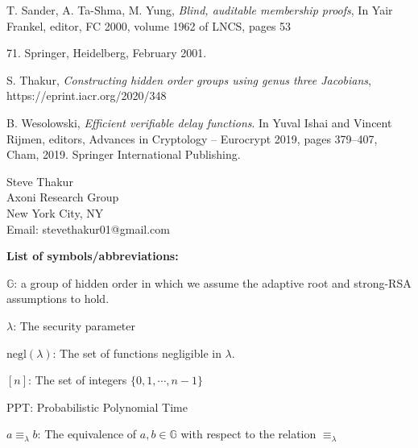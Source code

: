 \documentclass[11pt, lettersize, notitlepage, leqno, footskip=0.6cm]{article}
\newcommand{\negl}{\mr{negl}}
\newcommand{\eqlam}{\equiv_{\lam}}
\newcommand{\mb}{\mathbb}
\newcommand{\mr}{\mathrm}
\newcommand{\lam}{\lambda}
\newcommand{\noin}{\noindent}
\numberwithin{equation}{section}
\begin{document}
\noindent [STY01] T. Sander, A. Ta-Shma, M. Yung, \textit{Blind, auditable membership proofs}, In Yair Frankel, editor, FC 2000, volume 1962 of LNCS, pages 53{71. Springer, Heidelberg, February 2001.\vspace{0.1cm}


\noindent [Th20] S. Thakur, \textit{Constructing hidden order groups using genus three Jacobians}, https://eprint.iacr.org/2020/348\vspace{0.1cm} 

\noindent [Wes19] B. Wesolowski, \textit{Efficient verifiable delay functions}. In Yuval Ishai and Vincent Rijmen, editors, Advances in Cryptology – Eurocrypt 2019, pages 379–407, Cham, 2019. Springer International Publishing.\vspace{0.1cm}




\bigskip

\normalsize
\noindent Steve Thakur\\
Axoni Research Group\\
New York City, NY\\
Email: stevethakur01@gmail.com


\newpage


\begin{center}\textbf{List of symbols/abbreviations:}\end{center}

\noindent $\mb{G}$: a group of hidden order in which we assume the adaptive root and strong-RSA assumptions to hold. \vspace{0.1cm}

\noindent $\lam$: The security parameter \vspace{0.1cm}

\noindent $\negl(\lam)$: The set of functions negligible in $\lam$. \vspace{0.1cm}

\noindent $[n]$: The set of integers $\{0,1,\cdots,n-1 \}$ \vspace{0.1cm}

\noin PPT: Probabilistic Polynomial Time \vspace{0.1cm}

\noindent $a\eqlam b$: The equivalence of $a,b\in\mb{G}$ with respect to the relation $\eqlam$ \vspace{0.1cm}

}
\end{document}
